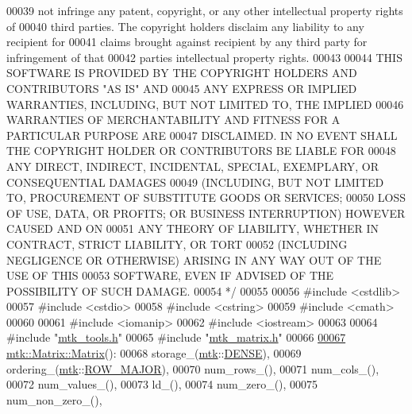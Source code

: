 \begin{DoxyCode}
00039 \textcolor{comment}{not infringe any patent, copyright, or any other intellectual property rights of}
00040 \textcolor{comment}{third parties. The copyright holders disclaim any liability to any recipient for}
00041 \textcolor{comment}{claims brought against recipient by any third party for infringement of that}
00042 \textcolor{comment}{parties intellectual property rights.}
00043 \textcolor{comment}{}
00044 \textcolor{comment}{THIS SOFTWARE IS PROVIDED BY THE COPYRIGHT HOLDERS AND CONTRIBUTORS "AS IS" AND}
00045 \textcolor{comment}{ANY EXPRESS OR IMPLIED WARRANTIES, INCLUDING, BUT NOT LIMITED TO, THE IMPLIED}
00046 \textcolor{comment}{WARRANTIES OF MERCHANTABILITY AND FITNESS FOR A PARTICULAR PURPOSE ARE}
00047 \textcolor{comment}{DISCLAIMED. IN NO EVENT SHALL THE COPYRIGHT HOLDER OR CONTRIBUTORS BE LIABLE FOR}
00048 \textcolor{comment}{ANY DIRECT, INDIRECT, INCIDENTAL, SPECIAL, EXEMPLARY, OR CONSEQUENTIAL DAMAGES}
00049 \textcolor{comment}{(INCLUDING, BUT NOT LIMITED TO, PROCUREMENT OF SUBSTITUTE GOODS OR SERVICES;}
00050 \textcolor{comment}{LOSS OF USE, DATA, OR PROFITS; OR BUSINESS INTERRUPTION) HOWEVER CAUSED AND ON}
00051 \textcolor{comment}{ANY THEORY OF LIABILITY, WHETHER IN CONTRACT, STRICT LIABILITY, OR TORT}
00052 \textcolor{comment}{(INCLUDING NEGLIGENCE OR OTHERWISE) ARISING IN ANY WAY OUT OF THE USE OF THIS}
00053 \textcolor{comment}{SOFTWARE, EVEN IF ADVISED OF THE POSSIBILITY OF SUCH DAMAGE.}
00054 \textcolor{comment}{*/}
00055 
00056 \textcolor{preprocessor}{#include <cstdlib>}
00057 \textcolor{preprocessor}{#include <cstdio>}
00058 \textcolor{preprocessor}{#include <cstring>}
00059 \textcolor{preprocessor}{#include <cmath>}
00060 
00061 \textcolor{preprocessor}{#include <iomanip>}
00062 \textcolor{preprocessor}{#include <iostream>}
00063 
00064 \textcolor{preprocessor}{#include "\hyperlink{mtk__tools_8h}{mtk\_tools.h}"}
00065 \textcolor{preprocessor}{#include "\hyperlink{mtk__matrix_8h}{mtk\_matrix.h}"}
00066 
\hypertarget{mtk__matrix_8cc_source_l00067}{}\hyperlink{classmtk_1_1Matrix_a04b8575764d3a649f21950c794f4cc02}{00067} \hyperlink{classmtk_1_1Matrix_a04b8575764d3a649f21950c794f4cc02}{mtk::Matrix::Matrix}():
00068   storage\_(\hyperlink{namespacemtk}{mtk}::\hyperlink{namespacemtk_ga25b67ec6a2afeee69f9bb196a9c66619a00a806d43a7d74e9ccca47a2134e9c87}{DENSE}),
00069   ordering\_(\hyperlink{namespacemtk}{mtk}::\hyperlink{namespacemtk_ga622801bd9f912d0f976c3e383f5f581cabc55178ac16eb1ce89b5f3ab915a91f3}{ROW\_MAJOR}),
00070   num\_rows\_(),
00071   num\_cols\_(),
00072   num\_values\_(),
00073   ld\_(),
00074   num\_zero\_(),
00075   num\_non\_zero\_(),

\end{DoxyCode}
